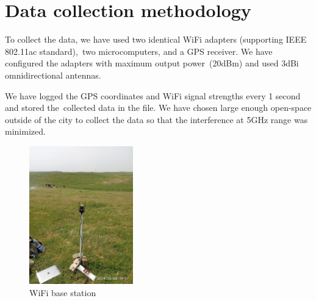 \section{Data collection methodology}
\label{section:experiments}

To collect the data, we have used two identical WiFi adapters 
(supporting IEEE 802.11ac standard), two microcomputers, and a 
GPS receiver. We have configured the adapters with maximum output 
power (20dBm) and used 3dBi omnidirectional antennas. 

We have logged the GPS coordinates and WiFi signal strengths every 1 
second and stored the collected data in the file. We have chosen large enough open-space
outside of the city to collect the data so that the interference at 5GHz range was minimized.


\begin{figure}[h!]
\centering
\includegraphics[width=0.4\textwidth]{graphics/wifi_outdoor.jpg}
\caption{WiFi base station}
\label{fig:basestion}
\end{figure}

